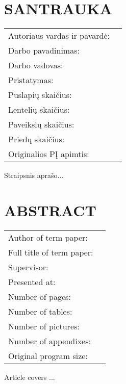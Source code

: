 \chapter*{SANTRAUKA}

\begin{tabular}{p{6cm} p{10cm}}
Autoriaus vardas ir pavardė:  & \\
Darbo pavadinimas:	          & \\
Darbo vadovas:		            & \\
Pristatymas:				          & \\
Puslapių skaičius:			      & \\
Lentelių skaičius:			      & \\
Paveikslų skaičius:			      & \\
Priedų skaičius: 			        & \\
Originalios PĮ apimtis:		    & \\
\end{tabular}

\vspace{1.5cm}

Straipsnis aprašo...

\newpage

\chapter*{ABSTRACT}

\begin{tabular}{p{6cm} p{10cm}}
Author of term paper: 		& \\
Full title of term paper:	& \\
Supervisor:					      & \\
Presented at:				      & \\
Number of pages:			    & \\
Number of tables:			    & \\
Number of pictures:			  & \\
Number of appendixes:		  & \\
Original program size:    & \\
\end{tabular}

\vspace{1.5cm}

Article covers ... 
